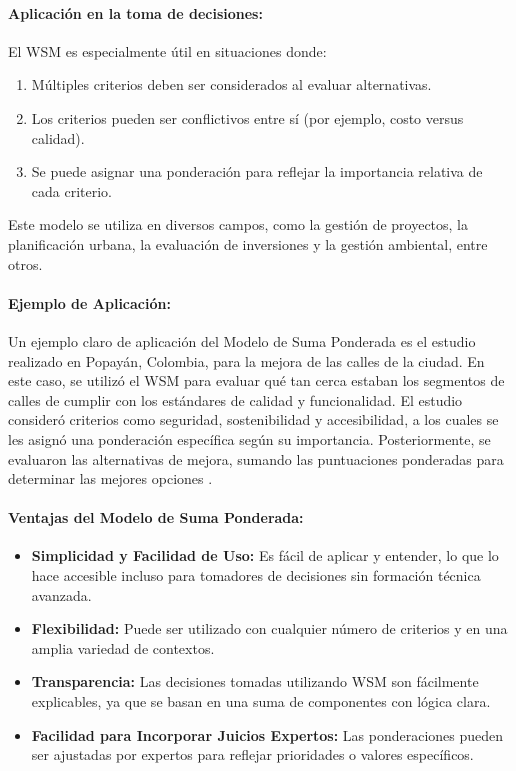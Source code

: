 \documentclass[12pt]{article}
\begin{document}
\paragraph{Aplicación en la toma de decisiones:}
El WSM es especialmente útil en situaciones donde:
\begin{enumerate}
    \item Múltiples criterios deben ser considerados al evaluar alternativas.
    \item Los criterios pueden ser conflictivos entre sí (por ejemplo, costo versus calidad).
    \item Se puede asignar una ponderación para reflejar la importancia relativa de cada criterio.
\end{enumerate}

Este modelo se utiliza en diversos campos, como la gestión de proyectos, la planificación urbana, la evaluación de inversiones y la gestión ambiental, entre otros.

\paragraph{Ejemplo de Aplicación:}
Un ejemplo claro de aplicación del Modelo de Suma Ponderada es el estudio realizado en Popayán, Colombia, para la mejora de las calles de la ciudad. En este caso, se utilizó el WSM para evaluar qué tan cerca estaban los segmentos de calles de cumplir con los estándares de calidad y funcionalidad. El estudio consideró criterios como seguridad, sostenibilidad y accesibilidad, a los cuales se les asignó una ponderación específica según su importancia. Posteriormente, se evaluaron las alternativas de mejora, sumando las puntuaciones ponderadas para determinar las mejores opciones  \cite{Alban2023}.

\paragraph{Ventajas del Modelo de Suma Ponderada:}
\begin{itemize}
    \item \textbf{Simplicidad y Facilidad de Uso:} Es fácil de aplicar y entender, lo que lo hace accesible incluso para tomadores de decisiones sin formación técnica avanzada.
    \item \textbf{Flexibilidad:} Puede ser utilizado con cualquier número de criterios y en una amplia variedad de contextos.
    \item \textbf{Transparencia:} Las decisiones tomadas utilizando WSM son fácilmente explicables, ya que se basan en una suma de componentes con lógica clara.
    \item \textbf{Facilidad para Incorporar Juicios Expertos:} Las ponderaciones pueden ser ajustadas por expertos para reflejar prioridades o valores específicos.
\end{itemize}
\end{document}
